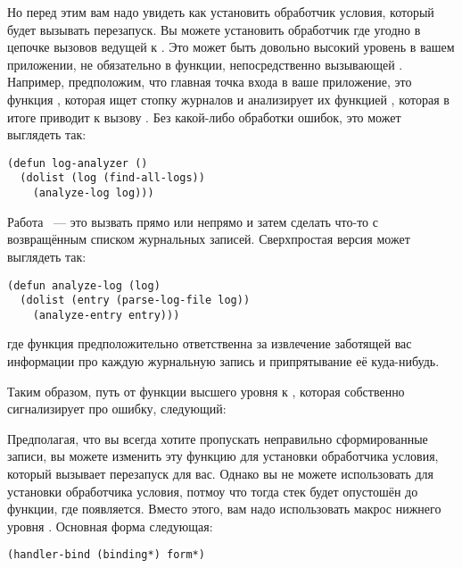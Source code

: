 Но перед этим вам надо увидеть как установить обработчик условия, который будет вызывать
 перезапуск. Вы можете установить обработчик где угодно в цепочке
вызовов ведущей к . Это может быть довольно высокий уровень в вашем
приложении, не обязательно в функции, непосредственно вызывающей
. Например, предположим, что главная точка входа в ваше приложение,
это функция , которая ищет стопку журналов и анализирует их функцией
, которая в итоге приводит к вызову . Без
какой-либо обработки ошибок, это может выглядеть так:

\begin{lstlisting}
(defun log-analyzer ()
  (dolist (log (find-all-logs))
    (analyze-log log)))
\end{lstlisting}

Работа ~--- это вызвать прямо или непрямо  и затем
сделать что-то с возвращённым списком журнальных записей. Сверхпростая версия может
выглядеть так:

\begin{lstlisting}
(defun analyze-log (log)
  (dolist (entry (parse-log-file log))
    (analyze-entry entry)))
\end{lstlisting}

\noindent{}где функция  предположительно ответственна за извлечение заботящей вас
информации про каждую журнальную запись и припрятывание её куда-нибудь.

Таким образом, путь от функции высшего уровня  к
, которая собственно сигнализирует про ошибку, следующий:


Предполагая, что вы всегда хотите пропускать неправильно сформированные записи, вы можете
изменить эту функцию для установки обработчика условия, который вызывает перезапуск
 для вас. Однако вы не можете использовать  для
установки обработчика условия, потмоу что тогда стек будет опустошён до функции, где
 появляется. Вместо этого, вам надо использовать макрос нижнего уровня
. Основная форма  следующая:

\begin{lstlisting}
(handler-bind (binding*) form*)
\end{lstlisting}

